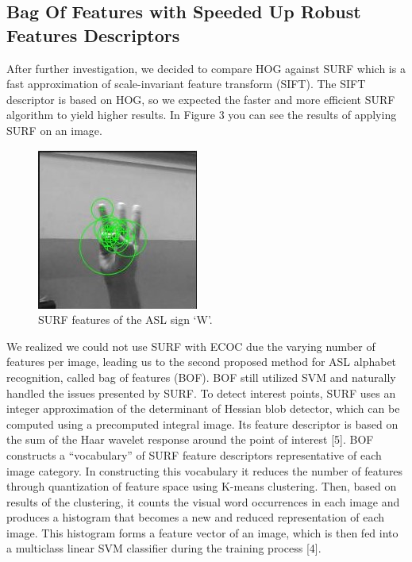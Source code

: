 \documentclass[conference]{IEEEtran}
\begin{document}
\subsection{Bag Of Features with Speeded Up Robust Features Descriptors}
After further investigation, we decided to compare HOG against SURF which is a fast approximation of scale-invariant feature transform (SIFT). The SIFT descriptor is based on HOG, so we expected the faster and more efficient SURF algorithm to yield higher results. In Figure 3 you can see the results of applying SURF on an image. 
\begin{figure}[h]
\centering
\includegraphics[width=0.5\linewidth]{SURF_W_sign}
\caption{SURF features of the ASL sign `W'.}
\end{figure}
We realized we could not use SURF with ECOC due the varying number of features per image, leading us to the second proposed method for ASL alphabet recognition, called bag of features (BOF). BOF still utilized SVM and naturally handled the issues presented by SURF. To detect interest points, SURF uses an integer approximation of the determinant of Hessian blob detector, which can be computed using a precomputed integral image. Its feature descriptor is based on the sum of the Haar wavelet response around the point of interest [5]. BOF constructs a “vocabulary” of SURF feature descriptors representative of each image category. In constructing this vocabulary it reduces the number of features through quantization of feature space using K-means clustering. Then, based on results of the clustering, it counts the visual word occurrences in each image and produces a histogram that becomes a new and reduced representation of each image. This histogram forms a feature vector of an image, which is then fed into a multiclass linear SVM classifier during the training process [4].
\end{document}
